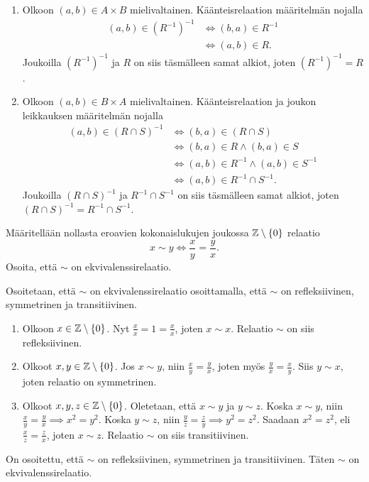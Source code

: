 \documentclass[11pt,a4paper]{amsart}
\begin{document}
\begin{solution}
\leavevmode\par
\begin{enumerate}[label=\alph*), nosep]
\item Olkoon \((a, b) \in A \times B\) mielivaltainen. Käänteisrelaation
määritelmän nojalla
\[
\begin{aligned}
  (a, b) \in (R^{-1})^{-1} &\iff (b, a) \in R^{-1} \\
  &\iff (a, b) \in R.
\end{aligned}
\]
Joukoilla \((R^{-1})^{-1}\) ja \(R\) on siis täsmälleen samat
alkiot, joten \((R^{-1})^{-1} = R\).

\item Olkoon \((a, b) \in B \times A\) mielivaltainen. Käänteisrelaation ja
joukon leikkauksen määritelmän nojalla
\[
\begin{aligned}
  (a, b) \in (R \cap S)^{-1} &\iff (b, a) \in (R \cap S) \\
  &\iff (b, a) \in R \land (b, a) \in S \\
  &\iff (a, b) \in R^{-1} \land (a, b) \in S^{-1} \\
  &\iff (a, b) \in R^{-1} \cap S^{-1}.
\end{aligned}
\]
Joukoilla \((R \cap S)^{-1}\) ja \(R^{-1} \cap S^{-1}\) on siis täsmälleen
samat alkiot, joten \((R \cap S)^{-1} = R^{-1} \cap S^{-1}\).
\end{enumerate}
\end{solution}

\begin{exercise}
Määritellään nollasta eroavien kokonaislukujen joukossa
\(\mathbb{Z} \setminus \left\lbrace0\right\rbrace\) relaatio
\[
x \sim y \iff \frac{x}{y} = \frac{y}{x}.
\]
Osoita, että \(\sim\) on ekvivalenssirelaatio.
\end{exercise}

\begin{solution}
Osoitetaan, että \(\sim\) on ekvivalenssirelaatio osoittamalla, että
\(\sim\) on refleksiivinen, symmetrinen ja transitiivinen.
\begin{enumerate}
\item Olkoon \(x \in \mathbb{Z} \setminus \left\lbrace0\right\rbrace\). Nyt
\(\frac{x}{x} = 1 = \frac{x}{x}\), joten \(x \sim x\). Relaatio \(\sim\) on
siis refleksiivinen.
\item Olkoot \(x,y \in \mathbb{Z} \setminus \left\lbrace0\right\rbrace\). Jos \(x \sim y\), niin
\(\frac{x}{y} = \frac{y}{x}\), joten myös
\(\frac{y}{x} = \frac{x}{y}\). Siis \(y \sim x\), joten relaatio on
symmetrinen.
\item Olkoot \(x,y,z \in \mathbb{Z} \setminus \left\lbrace0\right\rbrace\). Oletetaan, että
\(x \sim y\) ja \(y \sim z\). Koska \(x \sim y\), niin
\(\frac{x}{y} = \frac{y}{x} \implies x^2 = y^2\). Koska
\(y \sim z\), niin \(\frac{y}{z} = \frac{z}{y} \implies y^2 = z^2\).
Saadaan \(x^2 = z^2\), eli \(\frac{x}{z} = \frac{z}{x}\), joten
\(x \sim z\). Relaatio \(\sim\) on siis transitiivinen.
\end{enumerate}
On osoitettu, että \(\sim\) on refleksiivinen, symmetrinen ja transitiivinen.
Täten \(\sim\) on ekvivalenssirelaatio.
\end{solution}
\end{document}
